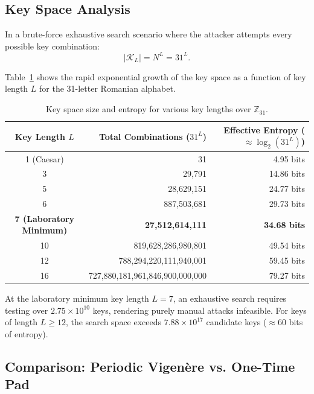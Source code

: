\documentclass[11pt,a4paper]{article}
\begin{document}
\subsection{Key Space Analysis}

In a brute-force exhaustive search scenario where the attacker attempts every possible key combination:
\begin{equation}
  |\mathcal{K}_L| = N^L = 31^L.
\end{equation}

Table~\ref{tab:keyspace} shows the rapid exponential growth of the key space as a function of key length $L$ for the 31-letter Romanian alphabet.

\begin{table}[H]
\centering
\small
\setlength{\tabcolsep}{12pt}
\renewcommand{\arraystretch}{1.15}
\begin{tabular}{crr}
\toprule
\textbf{Key Length $L$} & \textbf{Total Combinations ($31^L$)} & \textbf{Effective Entropy ($\approx \log_2(31^L)$)} \\
\midrule
1 (Caesar) & 31 & 4.95 bits \\
3          & 29,791 & 14.86 bits \\
5          & 28,629,151 & 24.77 bits \\
6          & 887,503,681 & 29.73 bits \\
\midrule
\textbf{7 (Laboratory Minimum)} & \textbf{27,512,614,111} & \textbf{34.68 bits} \\
10         & 819,628,286,980,801 & 49.54 bits \\
12         & 788,294,220,111,940,001 & 59.45 bits \\
16         & 727,880,181,961,846,900,000,000 & 79.27 bits \\
\bottomrule
\end{tabular}
\caption{Key space size and entropy for various key lengths over $\mathbb{Z}_{31}$.}
\label{tab:keyspace}
\end{table}

At the laboratory minimum key length $L = 7$, an exhaustive search requires testing over $2.75 \times 10^{10}$ keys, rendering purely manual attacks infeasible. For keys of length $L \ge 12$, the search space exceeds $7.88 \times 10^{17}$ candidate keys ($\approx 60$ bits of entropy).

\subsection{Comparison: Periodic Vigen\`ere vs. One-Time Pad}
\end{document}
